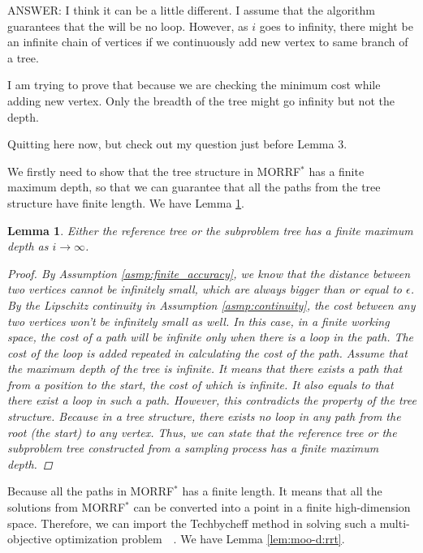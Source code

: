 \documentclass{article}
\newtheorem{lem}{Lemma}
\begin{document}
{\sc ANSWER:
I think it can be a little different.
I assume that the algorithm guarantees that the will be no loop.
However, as $ i $ goes to infinity, there might be an infinite chain of vertices if we continuously add new vertex to same branch of a tree.

I am trying to prove that because we are checking the minimum cost while adding new vertex.
Only the breadth of the tree might go infinity but not the depth.
}

{\sc Quitting here now, but check out my question just before Lemma 3.}

We firstly need to show that the tree structure in MORRF$^{*}$ has a finite maximum depth,
so that we can guarantee that all the paths from the tree structure have finite length.
We have Lemma \ref{lem:tree:finite_depth}.

\begin{lem}
\label{lem:tree:finite_depth}
Either the reference tree or the subproblem tree has a finite maximum depth as $ i \rightarrow \infty $.
\begin{proof}
By Assumption \ref{asmp:finite_accuracy}, we know that the distance between two vertices cannot be infinitely small, which are always bigger than or equal to $ \epsilon $.
By the Lipschitz continuity in Assumption \ref{asmp:continuity}, the cost between any two vertices won't be infinitely small as well.
In this case, in a finite working space, the cost of a path will be infinite only when there is a loop in the path.
The cost of the loop is added repeated in calculating the cost of the path.
Assume that the maximum depth of the tree is infinite.
It means that there exists a path that from a position to the start, the cost of which is infinite.
It also equals to that there exist a loop in such a path.
However, this contradicts the property of the tree structure. 
Because in a tree structure, there exists no loop in any path from the root (the start) to any vertex.
Thus, we can state that the reference tree or the subproblem tree constructed from a sampling process has a finite maximum depth.
\end{proof}
\end{lem}

Because all the paths in MORRF$^{*}$ has a finite length.
It means that all the solutions from MORRF$^{*}$ can be converted into a point in a finite high-dimension space.
Therefore, we can import the Techbycheff method in solving such a multi-objective optimization problem~\cite{4358754}~\cite{miettinen1999nonlinear}.
We have Lemma \ref{lem:moo-d:rrt}.
\end{document}
